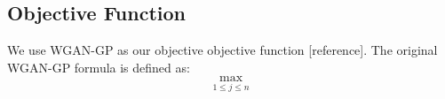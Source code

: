 \subsection{Objective Function}
We use WGAN-GP as our objective objective function [reference]. The original WGAN-GP formula is defined as:
\begin{equation}
\underset{1 \leq j \leq n}{\max}
\end{equation}